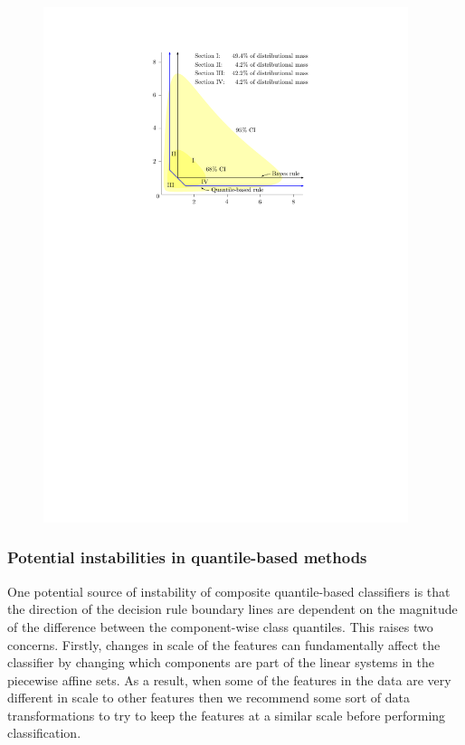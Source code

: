 \begin{figure}[ht]
\begin{minipage}[t]{0.49\linewidth}
    \includegraphics[width=0.95\textwidth]{exp_gauss_rule}
  \end{minipage}
\end{figure}



\subsubsection{Potential instabilities in quantile-based methods}
\label{sec:instabilities}

One potential source of instability of composite quantile-based classifiers is
that the direction of the decision rule boundary lines are dependent on the
magnitude of the difference between the component-wise class quantiles.  This
raises two concerns.  Firstly, changes in scale of the features can
fundamentally affect the classifier by changing which components are part of the
linear systems in the piecewise affine sets.  As a result, when some of the
features in the data are very different in scale to other features then we
recommend some sort of data transformations to try to keep the features at a
similar scale before performing classification.

